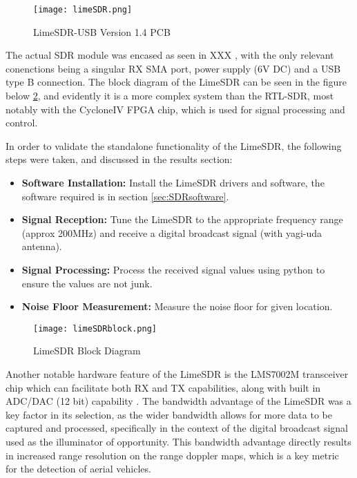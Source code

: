 \begin{figure}[htbp]
    \centering
    \texttt{[image: limeSDR.png]}
    \caption{LimeSDR-USB Version 1.4 PCB \cite{limesdr_usb}}
    \label{fig:limeSDR}
\end{figure}

The actual SDR module was encased as seen in XXX , with the only relevant conenctions being a singular RX SMA port, power supply (6V DC) and a USB type B connection. The block diagram of the LimeSDR can be seen in the figure below \ref{fig:limeSDRblock}, and evidently it is a more complex system than the RTL-SDR, most notably with the CycloneIV FPGA chip, which is used for signal processing and control.

In order to validate the standalone functionality of the LimeSDR, the following steps were taken, and discussed in the results section:
\begin{itemize}
    \item \textbf{Software Installation:} Install the LimeSDR drivers and software, the software required is in section \ref{sec:SDRsoftware}.
    \item \textbf{Signal Reception:} Tune the LimeSDR to the appropriate frequency range (approx 200MHz) and receive a digital broadcast signal (with yagi-uda antenna).
    \item \textbf{Signal Processing:} Process the received signal values using python to ensure the values are not junk.
    \item \textbf{Noise Floor Measurement:} Measure the noise floor for given location.
\end{itemize}

\begin{figure}[htbp]
    \centering
    \texttt{[image: limeSDRblock.png]}
    \caption{LimeSDR Block Diagram \cite{limesdr_usb}}
    \label{fig:limeSDRblock}
\end{figure}

Another notable hardware feature of the LimeSDR is the LMS7002M transceiver chip which can facilitate both RX and TX capabilities, along with built in ADC/DAC (12 bit) capability \cite{limesdr_usb}. The bandwidth advantage of the LimeSDR was a key factor in its selection, as the wider bandwidth allows for more data to be captured and processed, specifically in the context of the digital broadcast signal used as the illuminator of opportunity. This bandwidth advantage directly results in increased range resolution on the range doppler maps, which is a key metric for the detection of aerial vehicles. 


